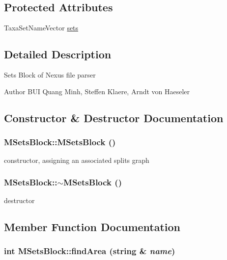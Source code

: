 \subsection*{Protected Attributes}
\begin{DoxyCompactItemize}
\item 
TaxaSetNameVector \hyperlink{classMSetsBlock_a30ed727f77895254e40487fc27ae2c97}{sets}
\end{DoxyCompactItemize}


\subsection{Detailed Description}
Sets Block of Nexus file parser

\begin{DoxyAuthor}{Author}
BUI Quang Minh, Steffen Klaere, Arndt von Haeseler 
\end{DoxyAuthor}


\subsection{Constructor \& Destructor Documentation}
\hypertarget{classMSetsBlock_a46e45cb2258e0c5295d2c22ed8a03333}{
\subsubsection[{MSetsBlock}]{\setlength{\rightskip}{0pt plus 5cm}MSetsBlock::MSetsBlock ()}}
\label{classMSetsBlock_a46e45cb2258e0c5295d2c22ed8a03333}
constructor, assigning an associated splits graph \hypertarget{classMSetsBlock_aec8a27486caa13efccfcef0420287c31}{
\subsubsection[{$\sim$MSetsBlock}]{\setlength{\rightskip}{0pt plus 5cm}MSetsBlock::$\sim$MSetsBlock ()}}
\label{classMSetsBlock_aec8a27486caa13efccfcef0420287c31}
destructor 

\subsection{Member Function Documentation}
\hypertarget{classMSetsBlock_aae67ce46658428cb5a1793f5ead91ea8}{
\subsubsection[{findArea}]{\setlength{\rightskip}{0pt plus 5cm}int MSetsBlock::findArea (string \& {\em name})}}
\label{classMSetsBlock_aae67ce46658428cb5a1793f5ead91ea8}

